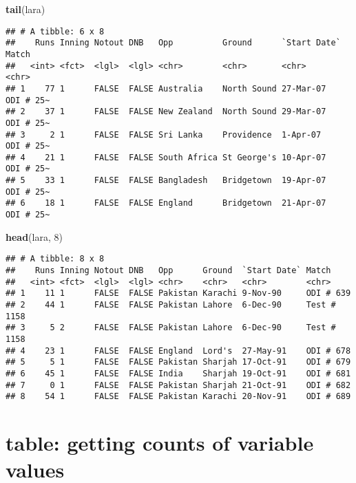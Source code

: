 \documentclass[]{book}
\newenvironment{Shaded}{\begin{snugshade}}{\end{snugshade}}
\newcommand{\DecValTok}[1]{\textcolor[rgb]{0.00,0.00,0.81}{#1}}
\newcommand{\KeywordTok}[1]{\textcolor[rgb]{0.13,0.29,0.53}{\textbf{#1}}}
\newcommand{\NormalTok}[1]{#1}
\begin{document}
\begin{Shaded}
\begin{Highlighting}[]
\KeywordTok{tail}\NormalTok{(lara)}
\end{Highlighting}
\end{Shaded}

\begin{verbatim}
## # A tibble: 6 x 8
##    Runs Inning Notout DNB   Opp          Ground      `Start Date` Match    
##   <int> <fct>  <lgl>  <lgl> <chr>        <chr>       <chr>        <chr>    
## 1    77 1      FALSE  FALSE Australia    North Sound 27-Mar-07    ODI # 25~
## 2    37 1      FALSE  FALSE New Zealand  North Sound 29-Mar-07    ODI # 25~
## 3     2 1      FALSE  FALSE Sri Lanka    Providence  1-Apr-07     ODI # 25~
## 4    21 1      FALSE  FALSE South Africa St George's 10-Apr-07    ODI # 25~
## 5    33 1      FALSE  FALSE Bangladesh   Bridgetown  19-Apr-07    ODI # 25~
## 6    18 1      FALSE  FALSE England      Bridgetown  21-Apr-07    ODI # 25~
\end{verbatim}

\begin{Shaded}
\begin{Highlighting}[]
\KeywordTok{head}\NormalTok{(lara, }\DecValTok{8}\NormalTok{)}
\end{Highlighting}
\end{Shaded}

\begin{verbatim}
## # A tibble: 8 x 8
##    Runs Inning Notout DNB   Opp      Ground  `Start Date` Match      
##   <int> <fct>  <lgl>  <lgl> <chr>    <chr>   <chr>        <chr>      
## 1    11 1      FALSE  FALSE Pakistan Karachi 9-Nov-90     ODI # 639  
## 2    44 1      FALSE  FALSE Pakistan Lahore  6-Dec-90     Test # 1158
## 3     5 2      FALSE  FALSE Pakistan Lahore  6-Dec-90     Test # 1158
## 4    23 1      FALSE  FALSE England  Lord's  27-May-91    ODI # 678  
## 5     5 1      FALSE  FALSE Pakistan Sharjah 17-Oct-91    ODI # 679  
## 6    45 1      FALSE  FALSE India    Sharjah 19-Oct-91    ODI # 681  
## 7     0 1      FALSE  FALSE Pakistan Sharjah 21-Oct-91    ODI # 682  
## 8    54 1      FALSE  FALSE Pakistan Karachi 20-Nov-91    ODI # 689
\end{verbatim}

\hypertarget{table}{%
\section*{\texorpdfstring{\textbf{table}: getting counts of variable values}{table: getting counts of variable values}}\label{table}}
\end{document}
